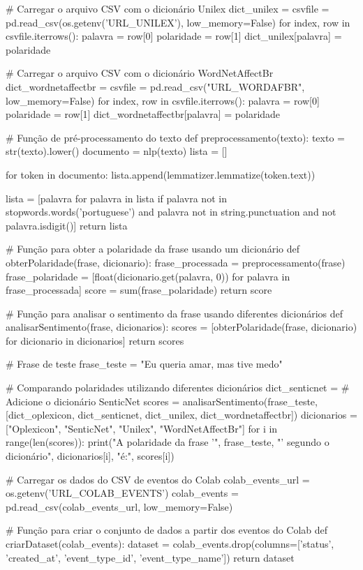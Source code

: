 \begin{codigo}[caption={Código de treinamento para análise de sentimento}, label={codigo:lex_train}, language=Python, breaklines=true]
# Carregar o arquivo CSV com o dicionário Unilex
dict_unilex = {}
csvfile = pd.read_csv(os.getenv('URL_UNILEX'), low_memory=False)
for index, row in csvfile.iterrows():
  palavra = row[0]
  polaridade = row[1]
  dict_unilex[palavra] = polaridade

# Carregar o arquivo CSV com o dicionário WordNetAffectBr
dict_wordnetaffectbr = {}
csvfile = pd.read_csv("URL_WORDAFBR", low_memory=False)
for index, row in csvfile.iterrows():
  palavra = row[0]
  polaridade = row[1]
  dict_wordnetaffectbr[palavra] = polaridade

# Função de pré-processamento do texto
def preprocessamento(texto):
  texto = str(texto).lower()
  documento = nlp(texto)
  lista = []
  
  for token in documento:
    lista.append(lemmatizer.lemmatize(token.text))
  
  lista = [palavra for palavra in lista if palavra not in stopwords.words('portuguese') and palavra not in string.punctuation and not palavra.isdigit()]
  return lista

# Função para obter a polaridade da frase usando um dicionário
def obterPolaridade(frase, dicionario):
  frase_processada = preprocessamento(frase)
  frase_polaridade = [float(dicionario.get(palavra, 0)) for palavra in frase_processada]
  score = sum(frase_polaridade)
  return score

# Função para analisar o sentimento da frase usando diferentes dicionários
def analisarSentimento(frase, dicionarios):
  scores = [obterPolaridade(frase, dicionario) for dicionario in dicionarios]
  return scores

# Frase de teste
frase_teste = "Eu queria amar, mas tive medo"

# Comparando polaridades utilizando diferentes dicionários
dict_senticnet = {}  # Adicione o dicionário SenticNet
scores = analisarSentimento(frase_teste, [dict_oplexicon, dict_senticnet, dict_unilex, dict_wordnetaffectbr])
dicionarios = ["Oplexicon", "SenticNet", "Unilex", "WordNetAffectBr"]
for i in range(len(scores)):
  print("A polaridade da frase '", frase_teste, "' segundo o dicionário", dicionarios[i], "é:", scores[i])

# Carregar os dados do CSV de eventos do Colab
colab_events_url = os.getenv('URL_COLAB_EVENTS')
colab_events = pd.read_csv(colab_events_url, low_memory=False)

# Função para criar o conjunto de dados a partir dos eventos do Colab
def criarDataset(colab_events):
  dataset = colab_events.drop(columns=['status', 'created_at', 'event_type_id', 'event_type_name'])
  return dataset


\end{codigo}
